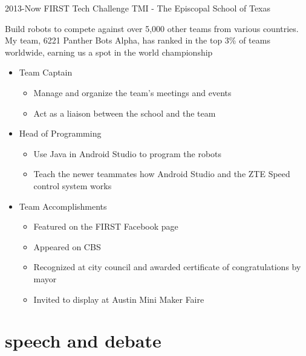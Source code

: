 \documentclass[]{friggeri-cv} %
\begin{document}
\begin{entrylist}
\entry
{2013-Now}
{FIRST Tech Challenge}
{TMI - The Episcopal School of Texas}
{Build robots to compete against over 5,000 other teams from various countries. My team, 6221 Panther Bots Alpha, has ranked in the top 3\% of teams worldwide, earning us a spot in the world championship 
\begin{itemize}
\item Team Captain 
\begin{itemize}
\item Manage and organize the team's meetings and events 
\item Act as a liaison between the school and the team 
\end{itemize}
\item Head of Programming 
\begin{itemize}
\item Use Java in Android Studio to program the robots 
\item Teach the newer teammates how Android Studio and the ZTE Speed control system works 
\end{itemize}
\end{itemize}
\begin{itemize}
\item Team Accomplishments 
\begin{itemize}
\item Featured on the FIRST Facebook page 
\item Appeared on CBS 
\item Recognized at city council and awarded certificate of congratulations by mayor 
\item Invited to display at Austin Mini Maker Faire 
\end{itemize}
\end{itemize}
}


\end{entrylist}


\section{speech and debate}
\end{document}
